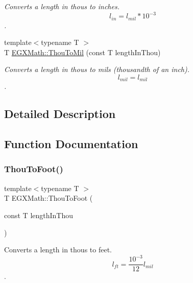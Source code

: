 \begin{DoxyCompactItemize}
\begin{DoxyCompactList}\small\item\em Converts a length in thous to inches. \[ l_{in}= l_{mil} * 10^{-3} \]. \end{DoxyCompactList}\item 
{\footnotesize template$<$typename T $>$ }\\T \mbox{\hyperlink{group___e_g_x_math-_conversions-_length_conversions-_imperial-_thou-_imperial_ga3e51ce22cf63efe45874ca707dbc1506}{E\+G\+X\+Math\+::\+Thou\+To\+Mil}} (const T length\+In\+Thou)
\begin{DoxyCompactList}\small\item\em Converts a length in thous to mils (thousandth of an inch). \[ l_{mil}=l_{mil} \]. \end{DoxyCompactList}\end{DoxyCompactItemize}


\subsection{Detailed Description}


\subsection{Function Documentation}
\mbox{\label{group___e_g_x_math-_conversions-_length_conversions-_imperial-_thou-_imperial_ga10138630a7c3b1f80dfb4a34552e0af5}} 
\subsubsection{\texorpdfstring{Thou\+To\+Foot()}{ThouToFoot()}}
{\footnotesize\ttfamily template$<$typename T $>$ \\
T E\+G\+X\+Math\+::\+Thou\+To\+Foot (\begin{DoxyParamCaption}\item[{const T}]{length\+In\+Thou }\end{DoxyParamCaption})}



Converts a length in thous to feet. \[ l_{ft}= \frac{10^{-3}}{12} l_{mil} \]. 

